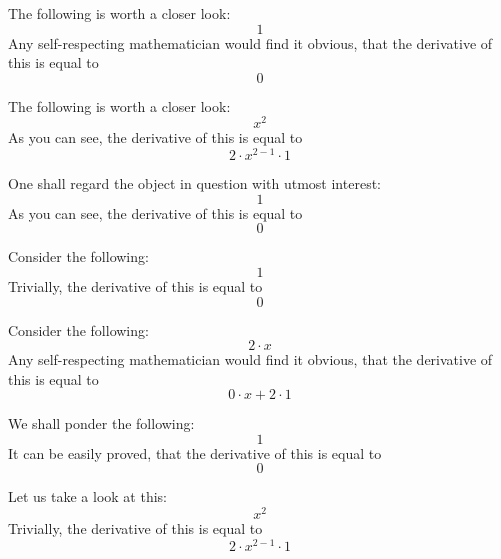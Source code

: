 \documentclass{article}
\begin{document}
The following is worth a closer look:
\begin{equation}
1 
\end{equation}
Any self-respecting mathematician would find it obvious, that the derivative of this is equal to
\begin{equation}
0 
\end{equation}

The following is worth a closer look:
\begin{equation}
x ^{2 } 
\end{equation}
As you can see, the derivative of this is equal to
\begin{equation}
2 \cdot x ^{2 - 1 } \cdot 1 
\end{equation}

One shall regard the object in question with utmost interest:
\begin{equation}
1 
\end{equation}
As you can see, the derivative of this is equal to
\begin{equation}
0 
\end{equation}

Consider the following:
\begin{equation}
1 
\end{equation}
Trivially, the derivative of this is equal to
\begin{equation}
0 
\end{equation}

Consider the following:
\begin{equation}
2 \cdot x 
\end{equation}
Any self-respecting mathematician would find it obvious, that the derivative of this is equal to
\begin{equation}
0 \cdot x + 2 \cdot 1 
\end{equation}

We shall ponder the following:
\begin{equation}
1 
\end{equation}
It can be easily proved, that the derivative of this is equal to
\begin{equation}
0 
\end{equation}

Let us take a look at this:
\begin{equation}
x ^{2 } 
\end{equation}
Trivially, the derivative of this is equal to
\begin{equation}
2 \cdot x ^{2 - 1 } \cdot 1 
\end{equation}
\end{document}
